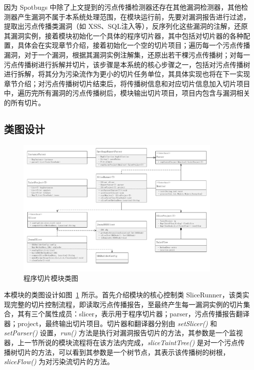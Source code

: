 因为 Spotbugs 中除了上文提到的污点传播检测器还存在其他漏洞检测器，其他检测器产生漏洞不属于本系统处理范围，在模块运行前，先要对漏洞报告进行过滤，提取出污点传播类漏洞（如 XSS、SQL注入等），反序列化这些漏洞的注解，还原其漏洞实例，接着模块初始化一个具体的程序切片器，其中包括对切片器的各种配置，具体会在实现章节介绍，接着初始化一个空的切片项目；遍历每一个污点传播漏洞，对于一个漏洞，根据其漏洞实例注解集，还原出若干棵污点传播树；对每一污点传播树进行拆解并切片，该步骤是本系统的核心步骤之一，包括对污点传播树进行拆解，将其分为污染流作为更小的切片任务单位，其具体实现也将在下一实现章节介绍；对污点传播树切片结束后，将传播树信息和对应切片信息加入切片项目中，遍历完所有漏洞的污点传播树后，模块输出切片项目，项目内包含与漏洞相关的所有切片。

\subsection{类图设计}

\begin{figure}[!htb]
    \centering
    \includegraphics[width=0.9\textwidth]{FIGs/chapter3/sliceClass.pdf}
    \caption{程序切片模块类图}\label{sliceClass}
\end{figure}

本模块的类图设计如图~\ref{sliceClass} 所示。首先介绍模块的核心控制类 SliceRunner，该类实现完整的切片控制流程，即读取污点传播报告，至最终产生每一漏洞实例的切片集合，其有三个属性成员：slicer，表示用于程序切片器；parser，污点传播报告翻译器；project，最终输出切片项目。切片器和翻译器分别由 \textit{setSlicer()} 和 \textit{setParser()} 设置，\textit{run()} 方法是执行对漏洞报告切片的方法，其参数是一个监视器，上一节所说的模块流程将在该方法内完成，\textit{sliceTaintTree()} 是对一个污点传播树切片的方法，可以看到其参数是一个树节点，其表示该传播树的树根，\textit{sliceFlow()} 为对污染流切片的方法。

